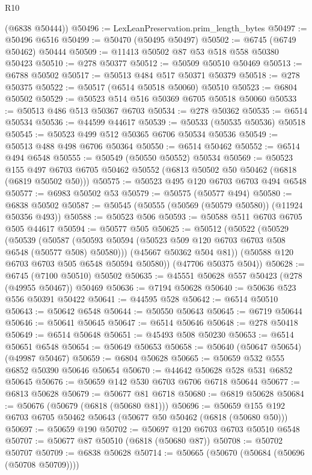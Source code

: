 \begin{lexlean}{R10}
\begin{coremodule}
      (@6838 @50444))
@50496 := LexLeanPreservation.prim_length_bytes
@50497 := @50496 @6516
@50499 := @50470 (@50495 @50497)
@50502 := @6745 (@6749 @50462) @50444
@50509 := @11413 @50502 @87 @53 @518 @558 @50380 @50423
@50510 := @278 @50377
@50512 := @50509 @50510 @50469
@50513 := @6788 @50502
@50517 := @50513 @484 @517 @50371 @50379
@50518 := @278 @50375
@50522 := @50517 (@6514 @50518 @50060) @50510
@50523 := @6804 @50502
@50529 := @50523 @514 @516 @50369 @6705 @50518 @50060
@50533 := @50513 @486 @513 @50367 @6703
@50534 := @278 @50362
@50535 := @6514 @50534
@50536 := @44599 @44617
@50539 := @50533 (@50535 @50536) @50518
@50545 := @50523 @499 @512 @50365 @6706 @50534 @50536
@50549 := @50513 @488 @498 @6706 @50364
@50550 := @6514 @50462
@50552 := @6514 @494 @6548
@50555 := @50549 (@50550 @50552) @50534
@50569 := @50523
    @155
    @497
    @6703
    @6705
    @50462
    @50552
    (@6813 @50502 @50 @50462 (@6818 (@6819 @50502 @50)))
@50575 := @50523 @495 @120 @6703 @6703 @494 @6548
@50577 := @6983 @50502 @53
@50579 := @50575 (@50577 @494)
@50580 := @6838 @50502
@50587 := @50545 (@50555 (@50569 (@50579 @50580)) (@11924 @50356 @493))
@50588 := @50523 @506
@50593 := @50588 @511 @6703 @6705 @505 @44617
@50594 := @50577 @505
@50625 := @50512
    (@50522
      (@50529
        (@50539
          (@50587 (@50593 @50594 (@50523 @509 @120 @6703 @6703 @508 @6548 (@50577 @508) @50580)))
          (@45667 @50362 @504 @81))
        (@50588 @120 @6703 @6703 @505 @6548 @50594 @50580))
      (@47706 @50375 @504))
@50628 := @6745 (@7100 @50510) @50502
@50635 := @45551 @50628 @557 @50423 (@278 (@49955 @50467)) @50469
@50636 := @7194 @50628
@50640 := @50636 @523 @556 @50391 @50422
@50641 := @44595 @528
@50642 := @6514 @50510
@50643 := @50642 @6548
@50644 := @50550 @50643
@50645 := @6719 @50644
@50646 := @50641 @50645
@50647 := @6514 @50646
@50648 := @278 @50418
@50649 := @6514 @50648
@50651 := @45493 @508 @50230
@50653 := @6514 @50651 @6548
@50654 := @50649 @50653
@50658 := @50640 (@50647 @50654) (@49987 @50467)
@50659 := @6804 @50628
@50665 := @50659 @532 @555 @6852 @50390 @50646 @50654
@50670 := @44642 @50628 @528 @531 @6852 @50645
@50676 := @50659 @142 @530 @6703 @6706 @6718 @50644
@50677 := @6813 @50628
@50679 := @50677 @81 @6718
@50680 := @6819 @50628
@50684 := @50676 (@50679 (@6818 (@50680 @81)))
@50696 := @50659 @155 @192 @6703 @6705 @50462 @50643 (@50677 @50 @50462 (@6818 (@50680 @50)))
@50697 := @50659 @190
@50702 := @50697 @120 @6703 @6703 @50510 @6548
@50707 := @50677 @87 @50510 (@6818 (@50680 @87))
@50708 := @50702 @50707
@50709 := @6838 @50628
@50714 := @50665 (@50670 (@50684 (@50696 (@50708 @50709))))

\end{coremodule}
\end{lexlean}
